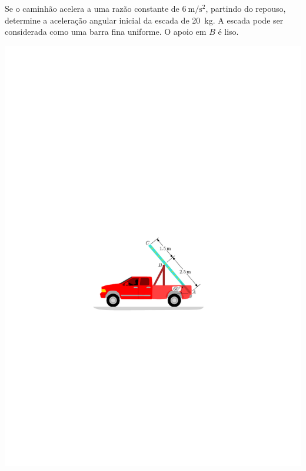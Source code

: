 \item Se o caminhão acelera a uma razão constante de $\SI{6}{\meter/\second^{2}}$, partindo do repouso, determine a aceleração angular inicial da escada de \SI{20}{\kilogram}. A escada pode ser considerada como uma barra fina uniforme. O apoio em $B$ é liso.

\begin{flushright}
	\includegraphics[scale=1.2]{../../images/draw_12}
\end{flushright}